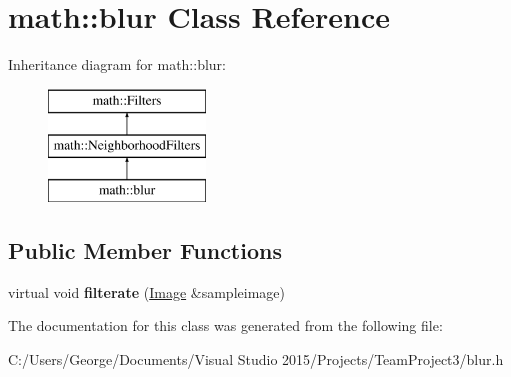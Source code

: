 \hypertarget{classmath_1_1blur}{}\section{math\+:\+:blur Class Reference}
\label{classmath_1_1blur}
Inheritance diagram for math\+:\+:blur\+:\begin{figure}[H]
\begin{center}
\leavevmode
\includegraphics[height=3.000000cm]{classmath_1_1blur}
\end{center}
\end{figure}
\subsection*{Public Member Functions}
\begin{DoxyCompactItemize}
\item 
\mbox{\label{classmath_1_1blur_a5fabbff573c2beaec676aec93945bef2}} 
virtual void {\bfseries filterate} (\hyperlink{classmath_1_1_image}{Image} \&sampleimage)
\end{DoxyCompactItemize}


The documentation for this class was generated from the following file\+:\begin{DoxyCompactItemize}
\item 
C\+:/\+Users/\+George/\+Documents/\+Visual Studio 2015/\+Projects/\+Team\+Project3/blur.\+h\end{DoxyCompactItemize}
